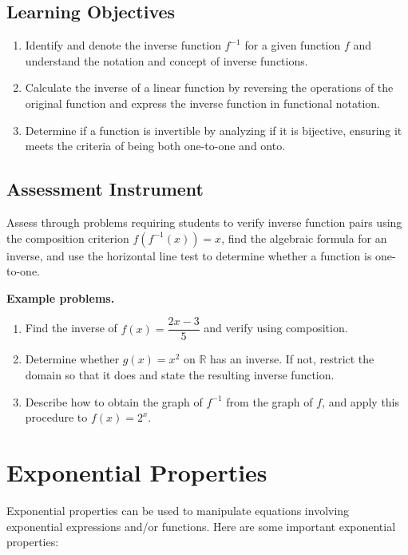 \subsection{Learning Objectives}
\label{ssec:lear-eeb6}

\begin{enumerate}
    \item Identify and denote the inverse function $f^{-1}$ for a given function $f$ and understand the notation and concept of inverse functions.
    \item Calculate the inverse of a linear function by reversing the operations of the original function and express the inverse function in functional notation.
    \item Determine if a function is invertible by analyzing if it is bijective, ensuring it meets the criteria of being both one-to-one and onto.
\end{enumerate}

\subsection{Assessment Instrument}
\label{ssec:asse-a1b3}

Assess through problems requiring students to verify inverse function pairs using the
composition criterion $f(f^{-1}(x)) = x$, find the algebraic formula for an inverse, and
use the horizontal line test to determine whether a function is one-to-one.

\textbf{Example problems.}

\begin{enumerate}
    \item Find the inverse of $f(x) = \dfrac{2x - 3}{5}$ and verify using composition.
    \item Determine whether $g(x) = x^2$ on $\mathbb{R}$ has an inverse. If not, restrict the domain so that it does and state the resulting inverse function.
    \item Describe how to obtain the graph of $f^{-1}$ from the graph of $f$, and apply this procedure to $f(x) = 2^x$.
\end{enumerate}

\section{Exponential Properties}
\label{sec:expo-7ac7}
Exponential properties can be used to manipulate equations involving exponential
expressions and/or functions. Here are some important exponential properties:

